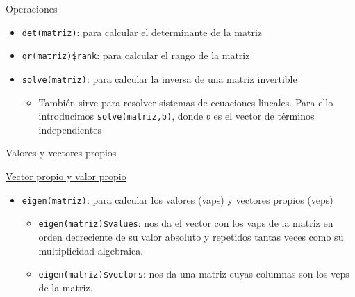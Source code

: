 \documentclass[
  ignorenonframetext,
]{beamer}
\providecommand{\tightlist}{%
  \setlength{\itemsep}{0pt}\setlength{\parskip}{0pt}}
\begin{document}
\begin{frame}[fragile]{Operaciones}
\protect\hypertarget{operaciones-2}{}

\begin{itemize}
\tightlist
\item
  \texttt{det(matriz)}: para calcular el determinante de la matriz
\item
  \texttt{qr(matriz)\$rank}: para calcular el rango de la matriz
\item
  \texttt{solve(matriz)}: para calcular la inversa de una matriz
  invertible

  \begin{itemize}
  \tightlist
  \item
    También sirve para resolver sistemas de ecuaciones lineales. Para
    ello introducimos \texttt{solve(matriz,b)}, donde \(b\) es el vector
    de términos independientes
  \end{itemize}
\end{itemize}

\end{frame}

\begin{frame}[fragile]{Valores y vectores propios}
\protect\hypertarget{valores-y-vectores-propios}{}

\href{https://es.wikipedia.org/wiki/Vector_propio_y_valor_propio}{Vector
propio y valor propio}

\begin{itemize}
\tightlist
\item
  \texttt{eigen(matriz)}: para calcular los valores (vaps) y vectores
  propios (veps)

  \begin{itemize}
  \tightlist
  \item
    \texttt{eigen(matriz)\$values}: nos da el vector con los vaps de la
    matriz en orden decreciente de su valor absoluto y repetidos tantas
    veces como su multiplicidad algebraica.
  \item
    \texttt{eigen(matriz)\$vectors}: nos da una matriz cuyas columnas
    son los veps de la matriz.
  \end{itemize}
\end{itemize}

\end{frame}
\end{document}
